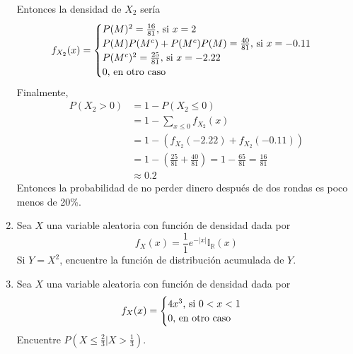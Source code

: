 \documentclass[12pt,a4paper]{report}
\begin{document}
\begin{enumerate}
{			Entonces la densidad de $X_2$ sería
			\[
				f_{X_2}(x) = \begin{cases}
							P(M)^2 = \frac{16}{81}, $ si $ x = 2\\
							P(M)P(M^c) + P(M^c)P(M) = \frac{40}{81}, $ si $ x = -0.11\\
							P(M^c)^2 = \frac{25}{81}, $ si $ x = -2.22\\
							0, $ en otro caso$
						 \end{cases}
			\]
			Finalmente,
			\begin{align*}
				P(X_2 > 0) &= 1 - P(X_2 \leq 0) \\
						 &= 1 - \sum_{x \leq 0}{f_{X_2}(x)}\\
						 &= 1 - (f_{X_2}(-2.22)+f_{X_2}(-0.11))\\
						 &= 1 - (\frac{25}{81} + \frac{40}{81})
						 = 1- \frac{65}{81}
						 = \frac{16}{81}\\
						 &\approx 0.2
			\end{align*}
			Entonces la probabilidad de no perder dinero después de dos rondas
			es poco menos de 20\%.

		}
		\item {
			Sea $X$ una variable aleatoria con función de densidad dada por
			\[f_X(x) = \frac{1}{1}e^{-|x|}\mathbb{I}_{\mathbb{R}}(x)\]
			Si $Y = X^2$, encuentre la función de distribución acumulada de $Y$.
		}
		\item {
			Sea $X$ una variable aleatoria con función de densidad dada por
			\[
				f_X(x) = \begin{cases}
									4x^3, $ si $ 0 < x < 1\\
									0, $ en otro caso$
								 \end{cases}
			\]
			Encuentre $P(X \leq \frac{2}{3}|X > \frac{1}{3})$.
		}
	\end{enumerate}
\end{document}
